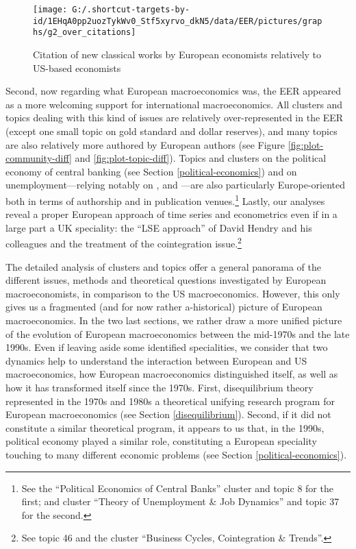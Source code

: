 \documentclass[]{elsarticle} %
\begin{document}
\begin{figure}[h]

{\centering \texttt{[image: G:/.shortcut-targets-by-id/1EHqA0pp2uozTykWv0\_Stf5xyrvo\_dkN5/data/EER/pictures/graphs/g2\_over\_citations]} 

}

\caption{Citation of new classical works by European economists relatively to US-based economists}\label{fig:plot-new-classical}
\end{figure}

Second, now regarding what European macroeconomics was, the EER appeared
as a more welcoming support for international macroeconomics. All
clusters and topics dealing with this kind of issues are relatively
over-represented in the EER (except one small topic on gold standard and
dollar reserves), and many topics are also relatively more authored by
European authors (see Figure \ref{fig:plot-community-diff} and
\ref{fig:plot-topic-diff}). Topics and clusters on the political economy
of central banking (see Section \ref{political-economics}) and on
unemployment---relying notably on \citet{pissarides1990},
\citet{mortensen1994} and \citet{layard1991a}---are also particularly
Europe-oriented both in terms of authorship and in publication
venues.\footnote{See the ``Political Economics of Central Banks''
  cluster and topic 8 for the first; and cluster ``Theory of
  Unemployment \& Job Dynamics'' and topic 37 for the second.} Lastly,
our analyses reveal a proper European approach of time series and
econometrics even if in a large part a UK speciality: the ``LSE
approach'' of David Hendry and his colleagues \citep[chapter
4]{qin2013a} and the treatment of the cointegration issue.\footnote{See
  topic 46 and the cluster ``Business Cycles, Cointegration \& Trends''.}

The detailed analysis of clusters and topics offer a general panorama of
the different issues, methods and theoretical questions investigated by
European macroeconomists, in comparison to the US macroeconomics.
However, this only gives us a fragmented (and for now rather
a-historical) picture of European macroeconomics. In the two last
sections, we rather draw a more unified picture of the evolution of
European macroeconomics between the mid-1970s and the late 1990s. Even
if leaving aside some identified specialities, we consider that two
dynamics help to understand the interaction between European and US
macroeconomics, how European macroeconomics distinguished itself, as
well as how it has transformed itself since the 1970s. First,
disequilibrium theory represented in the 1970s and 1980s a theoretical
unifying research program for European macroeconomics (see Section
\ref{disequilibrium}). Second, if it did not constitute a similar
theoretical program, it appears to us that, in the 1990s, political
economy played a similar role, constituting a European speciality
touching to many different economic problems (see Section
\ref{political-economics}).
\end{document}
